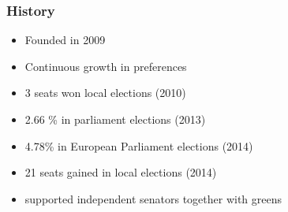 \begin{frame}
	\frametitle{History}
	\begin{itemize}
		\item Founded in 2009
		\item Continuous growth in preferences 
		\item 3 seats won local elections (2010)
		\item 2.66 \% in parliament elections (2013)
		\item 4.78\% in European Parliament elections (2014)
		\item 21 seats gained in local elections (2014)
		\item supported independent senators together with greens
	\end{itemize}
	
\end{frame}
